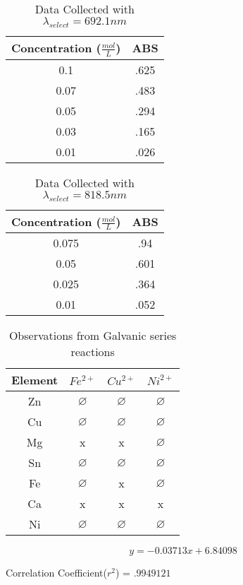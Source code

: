 \documentclass{article}
\begin{document}
    \begin{center}
        \begin{longtable}[c]{| c c |}
            \caption{Data Collected with $\lambda_{select} = 692.1 nm$ \label{long}}\\
            \hline
            Concentration ($\frac{mol}{L}$) & ABS\\
            \hline
            0.1  & .625\\
            0.07 & .483\\
            0.05 & .294\\
            0.03 & .165\\
            0.01 & .026\\
            \hline
        \end{longtable}
    \end{center}
    \begin{center}
        \begin{longtable}[c]{| c c |}
            \caption{Data Collected with $\lambda_{select} = 818.5 nm$ \label{long}}\\
            \hline
            Concentration ($\frac{mol}{L}$) & ABS\\
            \hline
            0.075 & .94\\
            0.05  & .601\\
            0.025 & .364\\
            0.01  & .052\\
            \hline
        \end{longtable}
    \end{center}

    \begin{center}
        \begin{longtable}[c]{| c c c c |}
            \caption{Observations from Galvanic series reactions \label{long}}\\
            \hline
            Element & $Fe^{2+}$ & $Cu^{2+}$ & $Ni^{2+}$\\
            \hline
            Zn & $\varnothing$ & $\varnothing$ & $\varnothing$ \\
            Cu & $\varnothing$ & $\varnothing$ & $\varnothing$\\
            Mg & x & x & $\varnothing$\\
            Sn & $\varnothing$ & $\varnothing$ & $\varnothing$\\
            Fe & $\varnothing$ & x & $\varnothing$\\
            Ca & x & x & x\\
            Ni & $\varnothing$ & $\varnothing$ & $\varnothing$\\
            \hline
        \end{longtable}
    \end{center}

    $$ y = -0.03713x + 6.84098$$
    \begin{center}
        Correlation Coefficient($r^{2}$) = $.9949121$
    \end{center}
\end{document}
